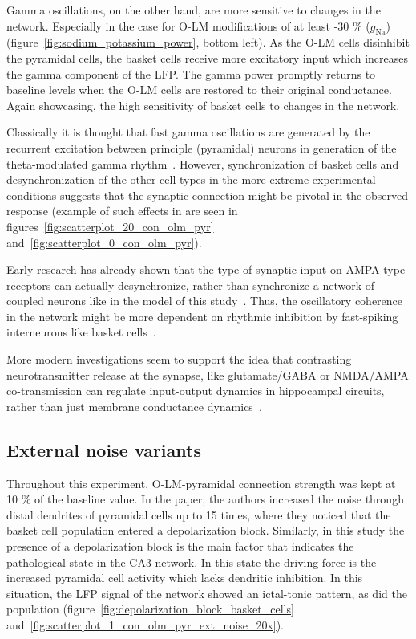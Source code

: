 Gamma oscillations, on the other hand, are more sensitive to changes in the network. Especially in the case for O-LM modifications of at least -30 \% (\(g_{\text{Na}}\))
(figure~\ref{fig:sodium_potassium_power}, bottom left). As the O-LM cells disinhibit the pyramidal cells, the basket cells receive more excitatory input which
increases the gamma component of the LFP\@. The gamma power promptly returns to baseline levels when the O-LM cells are restored to their original conductance.
Again showcasing, the high sensitivity of basket cells to changes in the network.

Classically it is thought that fast gamma oscillations are generated by the recurrent excitation between principle (pyramidal) neurons in
generation of the theta-modulated gamma rhythm~\parencite{wangGammaOscillationSynaptic1996}. However, synchronization of basket cells and
desynchronization of the other cell types in the more extreme experimental conditions suggests that the synaptic connection might be pivotal
in the observed response (example of such effects in are seen in figures~\ref{fig:scatterplot_20_con_olm_pyr} and~\ref{fig:scatterplot_0_con_olm_pyr}).

Early research has already shown that the type of synaptic input on AMPA type receptors can actually desynchronize, rather than synchronize
a network of coupled neurons like in the model of this study~\parencite{vanvreeswijkWhenInhibitionNot1994,khazipovSynchronizationGABAergicInterneuronal1997}.
Thus, the oscillatory coherence in the network might be more dependent on rhythmic inhibition by fast-spiking interneurons
like basket cells~\parencite{lyttonSimulationsCorticalPyramidal1991}.

More modern investigations seem to support the idea that contrasting neurotransmitter release at the synapse, like glutamate/GABA or NMDA/AMPA co-transmission
can regulate input-output dynamics in hippocampal circuits, rather than just membrane
conductance dynamics~\parencite{ajibolaHypothalamicGlutamateGABA2021,micheliMechanisticModelNMDA2021}.

\subsection{External noise variants}
Throughout this experiment, O-LM-pyramidal connection strength was kept at 10 \% of the baseline value.
In the \textcite{sanjayImpairedDendriticInhibition2015} paper, the authors increased the noise through distal dendrites of pyramidal cells up to 15 times,
where they noticed that the basket cell population entered a depolarization block. Similarly, in this study the presence of a depolarization block is the main factor
that indicates the pathological state in the CA3 network. In this state the driving force is the increased pyramidal cell activity which lacks dendritic inhibition.
In this situation, the LFP signal of the network showed an ictal-tonic pattern, as did the
population (figure~\ref{fig:depolarization_block_basket_cells} and~\ref{fig:scatterplot_1_con_olm_pyr_ext_noise_20x}).

